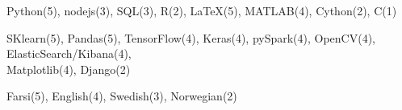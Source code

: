 
  \begin{cvitems}
    \vspace{.5\baselineskip}

   \item \small{Python(5), nodejs(3), SQL(3), R(2), \LaTeX(5), MATLAB(4), Cython(2), C(1)}
   \item \small{SKlearn(5), Pandas(5), TensorFlow(4), Keras(4), pySpark(4), OpenCV(4), ElasticSearch/Kibana(4),\\Matplotlib(4), Django(2)}
   \item \small{Farsi(5), English(4), Swedish(3), Norwegian(2)}

  \end{cvitems}
